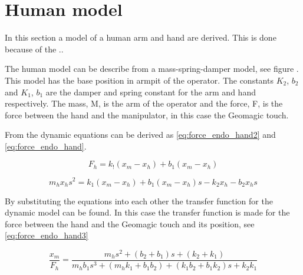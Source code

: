 \section{Human model}
In this section a model of a human arm and hand are derived. This is done because of the ..

The human model can be describe from a mass-spring-damper model, see figure . This model has the base position in armpit of the operator. The constants $K_2$, $b_2$ and $K_1$, $b_1$ are the damper and spring constant for the arm and hand respectively. The mass, M, is the arm of the operator and the force, F, is the force between the hand and the manipulator, in this case the Geomagic touch.




From  the dynamic equations can be derived as \eqref{eq:force_endo_hand2} and \eqref{eq:force_endo_hand}.

\begin{equation}
F_h = k_!(x_m-x_h)+b_1(x_m-x_h)
\label{eq:force_endo_hand2}
\end{equation}

\begin{equation}
m_hx_hs^2 = k_1(x_m-x_h)+b_1(x_m-x_h)s-k_2x_h-b_2x_hs
\label{eq:force_endow_hand}
\end{equation}

By substituting the equations into each other the transfer function for the dynamic model can be found. In this case the transfer function is made for the force between the hand and the Geomagic touch and its position, see \eqref{eq:force_endo_hand3}

\begin{equation}
\frac{x_m}{F_h} = \frac{m_hs^2+(b_2+b_1)s+(k_2+k_1)}{m_hb_1s^3+(m_hk_1+b_1b_2)+(k_1b_2+b_1k_2)s+k_2k_1}
\label{eq:force_endo_hand3}
\end{equation}